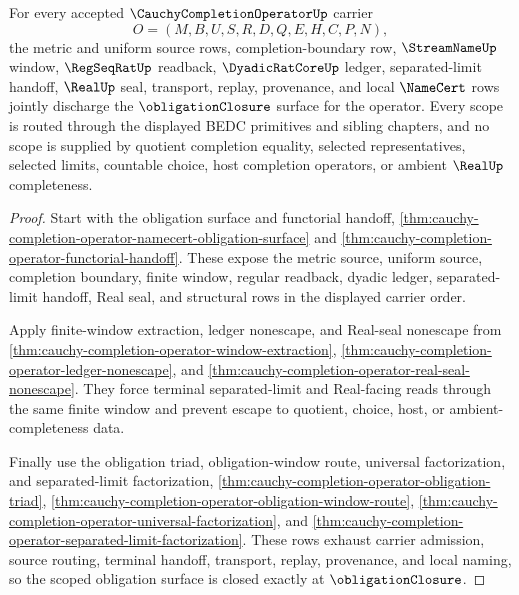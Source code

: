 \begin{theorem}
\label{thm:cauchy-completion-operator-scoped-obligation-closure}
For every accepted $\CauchyCompletionOperatorUp$ carrier
$$
O=(M,B,U,S,R,D,Q,E,H,C,P,N),
$$
the metric and uniform source rows, completion-boundary row, $\StreamNameUp$ window, $\RegSeqRatUp$ readback, $\DyadicRatCoreUp$ ledger, separated-limit handoff, $\RealUp$ seal, transport, replay, provenance, and local $\NameCert$ rows jointly discharge the $\obligationClosure$ surface for the operator. Every scope is routed through the displayed BEDC primitives and sibling chapters, and no scope is supplied by quotient completion equality, selected representatives, selected limits, countable choice, host completion operators, or ambient $\RealUp$ completeness.
\end{theorem}
\begin{proof}
Start with the obligation surface and functorial handoff, \autoref{thm:cauchy-completion-operator-namecert-obligation-surface} and \autoref{thm:cauchy-completion-operator-functorial-handoff}. These expose the metric source, uniform source, completion boundary, finite window, regular readback, dyadic ledger, separated-limit handoff, Real seal, and structural rows in the displayed carrier order.

Apply finite-window extraction, ledger nonescape, and Real-seal nonescape from \autoref{thm:cauchy-completion-operator-window-extraction}, \autoref{thm:cauchy-completion-operator-ledger-nonescape}, and \autoref{thm:cauchy-completion-operator-real-seal-nonescape}. They force terminal separated-limit and Real-facing reads through the same finite window and prevent escape to quotient, choice, host, or ambient-completeness data.

Finally use the obligation triad, obligation-window route, universal factorization, and separated-limit factorization, \autoref{thm:cauchy-completion-operator-obligation-triad}, \autoref{thm:cauchy-completion-operator-obligation-window-route}, \autoref{thm:cauchy-completion-operator-universal-factorization}, and \autoref{thm:cauchy-completion-operator-separated-limit-factorization}. These rows exhaust carrier admission, source routing, terminal handoff, transport, replay, provenance, and local naming, so the scoped obligation surface is closed exactly at $\obligationClosure$.
\end{proof}

